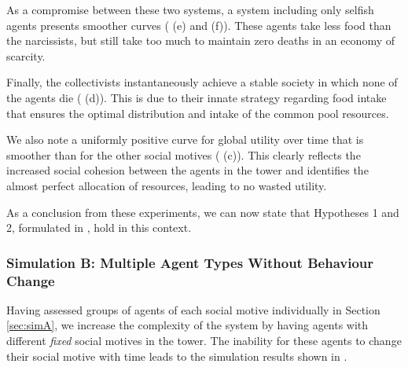 As a compromise between these two systems, a system including only selfish agents presents smoother curves ( (e) and (f)). These agents take less food than the narcissists, but still take too much to maintain zero deaths in an economy of scarcity.

Finally, the collectivists instantaneously achieve a stable society in which none of the agents die ( (d)). This is due to their innate strategy regarding food intake that ensures the optimal distribution and intake of the common pool resources.

We also note a uniformly positive curve for global utility over time that is smoother than for the other social motives ( (c)). This clearly reflects the increased social cohesion between the agents in the tower and identifies the almost perfect allocation of resources, leading to no wasted utility.

As a conclusion from these experiments, we can now state that Hypotheses 1 and 2, formulated in , hold in this context.

\subsubsection{Simulation B: Multiple Agent Types Without Behaviour Change}

Having assessed groups of agents of each social motive individually in Section \ref{sec:simA}, we increase the complexity of the system by having agents with different \textit{fixed} social motives in the tower. The inability for these agents to change their social motive with time leads to the simulation results shown in .

